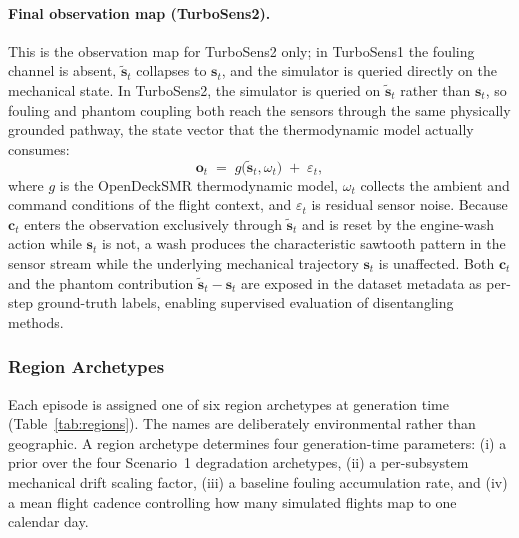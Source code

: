 \paragraph{Final observation map (TurboSens2).}
This is the observation map for TurboSens2 only; in TurboSens1 the
fouling channel is absent, $\tilde{\mathbf{s}}_t$ collapses to
$\mathbf{s}_t$, and the simulator is queried directly on the
mechanical state. In TurboSens2, the simulator is queried on
$\tilde{\mathbf{s}}_t$ rather than $\mathbf{s}_t$, so fouling and
phantom coupling both reach the sensors through the same physically
grounded pathway, the state vector that the thermodynamic model
actually consumes:
\begin{equation}
  \mathbf{o}_t \;=\; g\!\bigl(\tilde{\mathbf{s}}_t, \omega_t\bigr)
  \;+\; \varepsilon_t,
  \label{eq:obs}
\end{equation}
where $g$ is the OpenDeckSMR thermodynamic model, $\omega_t$ collects
the ambient and command conditions of the flight context, and
$\varepsilon_t$ is residual sensor noise. Because $\mathbf{c}_t$ enters
the observation exclusively through $\tilde{\mathbf{s}}_t$ and is
reset by the engine-wash action while $\mathbf{s}_t$ is not, a wash
produces the characteristic sawtooth pattern in the sensor stream
while the underlying mechanical trajectory $\mathbf{s}_t$ is unaffected.
Both $\mathbf{c}_t$ and the phantom contribution $\tilde{\mathbf{s}}_t - \mathbf{s}_t$ are exposed in the  dataset metadata as per-step ground-truth labels, enabling supervised  evaluation of disentangling methods.

\subsubsection{Region Archetypes}
\label{sec:scen4_regions}

Each episode is assigned one of six region archetypes at generation
time (Table~\ref{tab:regions}). The names are deliberately
environmental rather than geographic. A region archetype determines four generation-time
parameters: (i) a prior over the four Scenario~1 degradation
archetypes, (ii) a per-subsystem mechanical drift scaling factor,
(iii) a baseline fouling accumulation rate, and (iv) a mean
flight cadence controlling how many simulated flights map to one
calendar day.

